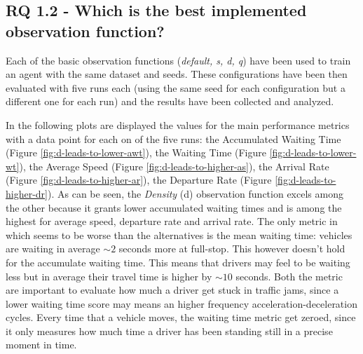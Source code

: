 \subsection{RQ 1.2 - Which is the best implemented observation function?}

Each of the basic observation functions (\textit{default, s, d, q}) have been used to train an agent with the same dataset and seeds. These configurations have been then evaluated with five runs each (using the same seed for each configuration but a different one for each run) and the results have been collected and analyzed.

In the following plots are displayed the values for the main performance metrics with a data point for each on of the five runs: the Accumulated Waiting Time (Figure \ref{fig:d-leads-to-lower-awt}), the Waiting Time (Figure \ref{fig:d-leads-to-lower-wt}), the Average Speed (Figure \ref{fig:d-leads-to-higher-as}), the Arrival Rate (Figure \ref{fig:d-leads-to-higher-ar}), the Departure Rate (Figure \ref{fig:d-leads-to-higher-dr}).
As can be seen, the \textit{Density} (d) observation function excels among the other because it grants lower accumulated waiting times and is among the highest for average speed, departure rate and arrival rate.
The only metric in which seems to be worse than the alternatives is the mean waiting time: vehicles are waiting in average $\sim2$ seconds more at full-stop.
This however doesn't hold for the accumulate waiting time.
This means that drivers may feel to be waiting less but in average their travel time is higher by $\sim10$ seconds.
Both the metric are important to evaluate how much a driver get stuck in traffic jams, since a lower waiting time score may means an higher frequency acceleration-deceleration cycles.
Every time that a vehicle moves, the waiting time metric get zeroed, since it only measures how much time a driver has been standing still in a precise moment in time.


